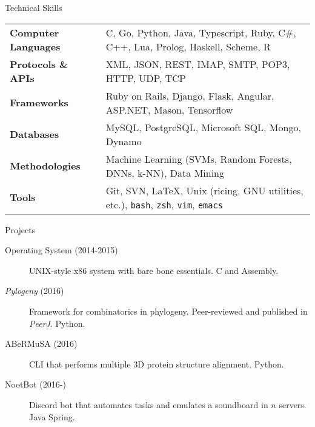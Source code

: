 \documentclass{resume} %
\begin{document}
\begin{rSection}{Technical Skills}

\begin{tabular}{ @{} >{\bfseries}l @{\hspace{1ex}} l }
Computer Languages & C, Go, Python, Java, Typescript, Ruby, C\#, C++, Lua, Prolog, Haskell, Scheme, R \\
Protocols \& APIs & XML, JSON, REST, IMAP, SMTP, POP3, HTTP, UDP, TCP \\
Frameworks & Ruby on Rails, Django, Flask, Angular, ASP.NET, Mason, Tensorflow \\ 
Databases & MySQL, PostgreSQL, Microsoft SQL, Mongo, Dynamo \\
Methodologies & Machine Learning (SVMs, Random Forests, DNNs, k-NN), Data Mining \\
Tools & Git, SVN, \LaTeX, Unix (ricing, GNU utilities, etc.), \texttt{bash}, \texttt{zsh}, \texttt{vim}, \texttt{emacs}
\end{tabular}

\end{rSection}


\begin{rSection}{Projects}

\begin{description}
\item [Operating System (2014-2015)] UNIX-style x86 system with bare bone essentials. C and Assembly.
\item [\textit{Pylogeny} (2016)] Framework for combinatorics in phylogeny. Peer-reviewed and published in \textit{PeerJ}. Python.
\item [ABeRMuSA (2016)] CLI that performs multiple 3D protein structure alignment. Python.
\item [NootBot (2016-)] Discord bot that automates tasks and emulates a soundboard in $n$ servers. Java Spring.
\end{description}

\end{rSection}

\end{document}
